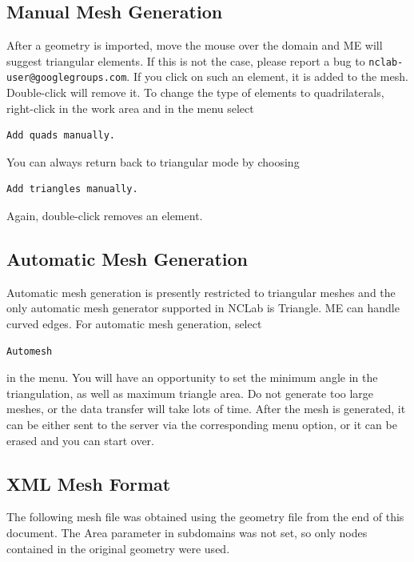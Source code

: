 \documentclass{article}
\begin{document}
\subsection*{Manual Mesh Generation}

After a geometry is imported, move the mouse over the domain and ME will suggest triangular 
elements. If this is not the case, please report a bug to {\tt nclab-user@googlegroups.com}. 
If you click on such an element, it is added to the mesh. Double-click will remove it. 
To change the type of elements to quadrilaterals, right-click in the work area and in the 
menu select 

\begin{verbatim}
Add quads manually. 
\end{verbatim}
You can always return back to triangular mode by choosing 

\begin{verbatim}
Add triangles manually. 
\end{verbatim}
Again, double-click removes an element.

\subsection*{Automatic Mesh Generation}

Automatic mesh generation is presently restricted to triangular meshes and 
the only automatic mesh generator supported in NCLab is Triangle. ME 
can handle curved edges.
For automatic mesh generation, select 

\begin{verbatim}
Automesh
\end{verbatim}
in the menu. You will have an opportunity to set the minimum 
angle in the triangulation, as well as maximum triangle area.
Do not generate too large meshes, or the data transfer will 
take lots of time. 
After the mesh is generated, it can be either sent to the server
via the corresponding menu option, or it can be erased and 
you can start over.

\subsection*{XML Mesh Format}

The following mesh file was obtained using the geometry file from the end 
of this document. The Area parameter in subdomains was not set, so only 
nodes contained in the original geometry were used. 
\end{document}
